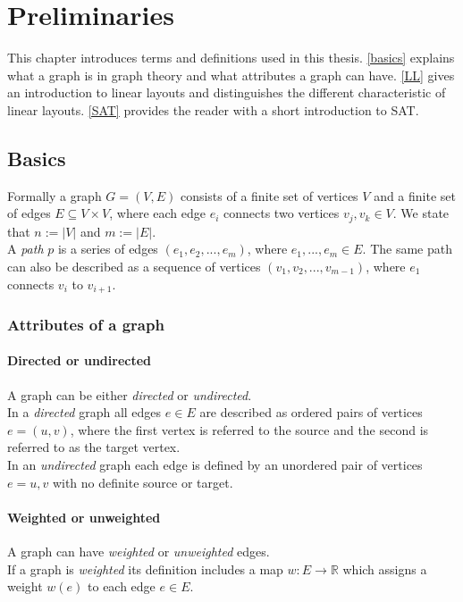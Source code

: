 
\chapter{Preliminaries}
  \label{PR}
This chapter introduces terms and definitions used in this thesis. \autoref{basics} explains what a graph is in graph theory and what attributes a graph can have. 
\autoref{LL} gives an introduction to linear layouts and distinguishes the different characteristic of linear layouts.
\autoref{SAT} provides the reader with a short introduction to SAT. 
\section{Basics}
\label{basics}
Formally a graph $G = (V, E)$ consists of a finite set of vertices $V$ and a finite set of edges $E \subseteq V \times V$, where each edge $e_i$ connects two vertices $v_j, v_k \in V$. We state that $n := |V|$ and $m := |E|$.\\
A \textit{path} $p$ is a series of edges $(e_1, e_2,...,e_m)$, where $e_1,...,e_m \in E$. The same path can also be described as a sequence of vertices $(v_1,v_2,...,v_{m-1})$, where  $e_1$ connects $v_i$ to $v_{i+1}$.
\subsection{Attributes of a graph}
\subsubsection{Directed or undirected}
A graph can be either \textit{directed} or \textit{undirected}.\\
In a \textit{directed} graph all edges $e \in E$ are described as ordered pairs of vertices $e = (u,v)$, where the first vertex is referred to the source and the second is referred to as the target vertex.\\
In an \textit{undirected} graph each edge is defined by an unordered pair of vertices $e = {u,v}$ with no definite source or target. 
\subsubsection{Weighted or unweighted}
A graph can have \textit{weighted} or \textit{unweighted} edges.\\
If a graph is \textit{weighted} its definition includes a map $w: E \rightarrow \mathbb{R}$ which assigns a weight $w(e)$ to each edge $e \in E$. 
